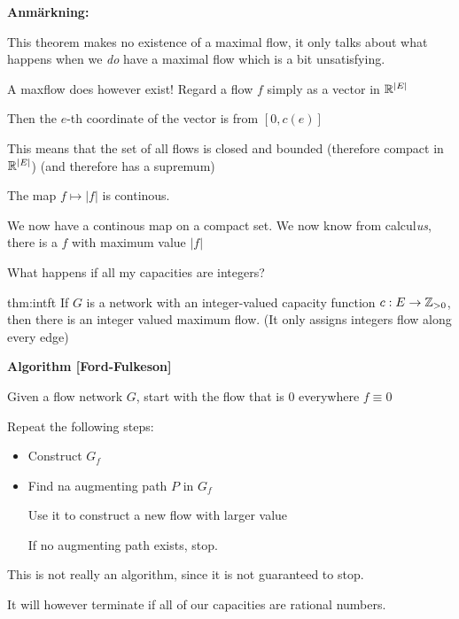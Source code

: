 \par\bigskip
\noindent\textbf{Anmärkning:}\par
\noindent This theorem makes no existence of a maximal flow, it only talks about what happens when we \textit{do} have a maximal flow which is a bit unsatisfying.
\par\bigskip
\noindent A maxflow does however exist! Regard a flow $f$ simply as a vector in $\mathbb{R}^{\left|E\right|}$\par
\noindent Then the $e$-th coordinate of the vector is from $[0,c(e)]$\par
\noindent This means that the set of all flows is closed and bounded (therefore compact in $\mathbb{R}^{\left|E\right|}$) (and therefore has a supremum)\par
\noindent The map $f\mapsto\left|f\right|$ is continous.
\par\bigskip
\noindent We now have a continous map on a compact set. We now know from calcul\textit{us}, there is a $f$ with maximum value $\left|f\right|$ 
\par\bigskip
\noindent What happens if all my capacities are integers?
\par\bigskip
\begin{theo}{thm:intft}
  If $G$ is a network with an integer-valued capacity function $c:E\to\mathbb{Z}_{>0}$, then there is an integer valued maximum flow. (It only assigns integers flow along every edge)
\end{theo}
\par\bigskip
\noindent\textbf{Algorithm [Ford-Fulkeson]}\par
\noindent Given a flow network $G$, start with the flow that is 0 everywhere $f\equiv 0$
\par\bigskip
\noindent Repeat the following steps:\par
\begin{itemize}
  \item Construct $G_f$\par
  \item Find na augmenting path $P$ in $G_f$\par
    Use it to construct a new flow with larger value\par
    If no augmenting path exists, stop.
\end{itemize}
\par\bigskip
\noindent This is not really an algorithm, since it is not guaranteed to stop.\par
\noindent It will however terminate if all of our capacities are rational numbers. 
